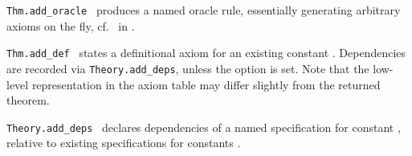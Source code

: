 \begin{isabellebody}
\begin{isamarkuptext}
\begin{description}
  \item \verb|Thm.add_oracle|~ produces a named
  oracle rule, essentially generating arbitrary axioms on the fly,
  cf.\  in .

  \item \verb|Thm.add_def|~ states a definitional axiom for an existing constant
  .  Dependencies are recorded via \verb|Theory.add_deps|,
  unless the  option is set.  Note that the
  low-level representation in the axiom table may differ slightly from
  the returned theorem.

  \item \verb|Theory.add_deps|~
  declares dependencies of a named specification for constant , relative to existing specifications for constants .


\end{description}
\end{isamarkuptext}
\end{isabellebody}
